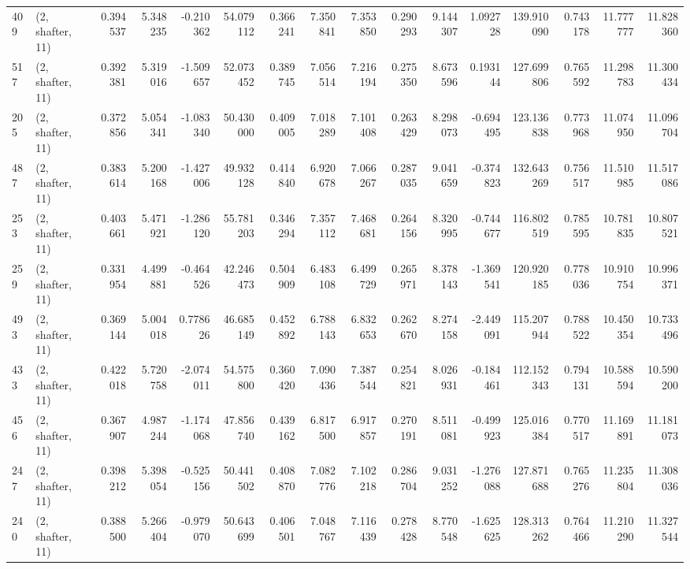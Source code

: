 \begin{tabular}{llrrrrrrrrrrrrrr}
409 &  (2, shafter, 11) &   0.394537 &   5.348235 &  -0.210362 &    54.079112 &   0.366241 &   7.350841 &   7.353850 &  0.290293 &   9.144307 &   1.092728 &   139.910090 &  0.743178 &  11.777777 &  11.828360 \\
517 &  (2, shafter, 11) &   0.392381 &   5.319016 &  -1.509657 &    52.073452 &   0.389745 &   7.056514 &   7.216194 &  0.275350 &   8.673596 &   0.193144 &   127.699806 &  0.765592 &  11.298783 &  11.300434 \\
205 &  (2, shafter, 11) &   0.372856 &   5.054341 &  -1.083340 &    50.430000 &   0.409005 &   7.018289 &   7.101408 &  0.263429 &   8.298073 &  -0.694495 &   123.136838 &  0.773968 &  11.074950 &  11.096704 \\
487 &  (2, shafter, 11) &   0.383614 &   5.200168 &  -1.427006 &    49.932128 &   0.414840 &   6.920678 &   7.066267 &  0.287035 &   9.041659 &  -0.374823 &   132.643269 &  0.756517 &  11.510985 &  11.517086 \\
253 &  (2, shafter, 11) &   0.403661 &   5.471921 &  -1.286120 &    55.781203 &   0.346294 &   7.357112 &   7.468681 &  0.264156 &   8.320995 &  -0.744677 &   116.802519 &  0.785595 &  10.781835 &  10.807521 \\
259 &  (2, shafter, 11) &   0.331954 &   4.499881 &  -0.464526 &    42.246473 &   0.504909 &   6.483108 &   6.499729 &  0.265971 &   8.378143 &  -1.369541 &   120.920185 &  0.778036 &  10.910754 &  10.996371 \\
493 &  (2, shafter, 11) &   0.369144 &   5.004018 &   0.778626 &    46.685149 &   0.452892 &   6.788143 &   6.832653 &  0.262670 &   8.274158 &  -2.449091 &   115.207944 &  0.788522 &  10.450354 &  10.733496 \\
433 &  (2, shafter, 11) &   0.422018 &   5.720758 &  -2.074011 &    54.575800 &   0.360420 &   7.090436 &   7.387544 &  0.254821 &   8.026931 &  -0.184461 &   112.152343 &  0.794131 &  10.588594 &  10.590200 \\
456 &  (2, shafter, 11) &   0.367907 &   4.987244 &  -1.174068 &    47.856740 &   0.439162 &   6.817500 &   6.917857 &  0.270191 &   8.511081 &  -0.499923 &   125.016384 &  0.770517 &  11.169891 &  11.181073 \\
247 &  (2, shafter, 11) &   0.398212 &   5.398054 &  -0.525156 &    50.441502 &   0.408870 &   7.082776 &   7.102218 &  0.286704 &   9.031252 &  -1.276088 &   127.871688 &  0.765276 &  11.235804 &  11.308036 \\
240 &  (2, shafter, 11) &   0.388500 &   5.266404 &  -0.979070 &    50.643699 &   0.406501 &   7.048767 &   7.116439 &  0.278428 &   8.770548 &  -1.625625 &   128.313262 &  0.764466 &  11.210290 &  11.327544 \\

\end{tabular}
